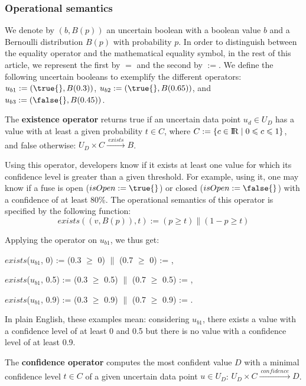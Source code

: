 \subsubsection{Operational semantics}
We denote by $(b, B(p))$ an uncertain boolean with a boolean value $b$ and a Bernoulli distribution $B(p)$ with probability $p$.
In order to distinguish between the equality operator and the mathematical equality symbol, in the rest of this article, we represent the first by $=$ and the second by $:=$.
We define the following uncertain booleans to exemplify the different operators: $u_{b1} := (\true{}, B(0.3))$, $u_{b2} := (\true{}, B(0.65))$, and $u_{b3} := (\false{}, B(0.45))$.

\begin{operator}
	\label{op:existence}
	The \textbf{existence operator} returns true if an uncertain data point $u_d \in U_D$ has a value with at least a given probability $t \in C$, where $C := \{ c \in {\rm I\!R} \mid 0 \leqslant c \leqslant 1 \}$, and false otherwise:  $U_D \times C \xrightarrow{~exists~} B$.
\end{operator}

Using this operator, developers know if it exists at least one value for which its confidence level is greater than a given threshold. For example, using it, one may know if a fuse is open ($isOpen := \true{}$) or closed ($isOpen := \false{}$) with a confidence of at least 80\%.
The operational semantics of this operator is specified by the following function: $$exists((v, B(p)), t) := (p \geqslant t) \| (1-p \geqslant t)$$

Applying the operator on $u_{b1}$, we thus get:
\begin{itemize*}
    \item[] $exists$($u_{b1}$, 0) := (0.3 $\geqslant$ 0) $\|$ (0.7 $\geqslant$ 0) := \true{},
    \item[] $exists$($u_{b1}$, 0.5) := (0.3 $\geqslant$ 0.5) $\|$ (0.7 $\geqslant$ 0.5) := \true{},
    \item[] $exists$($u_{b1}$, 0.9) := (0.3 $\geqslant$ 0.9) $\|$ (0.7 $\geqslant$ 0.9) := \false{}.
\end{itemize*}
In plain English, these examples mean: considering $u_{b1}$, there exists a value with a confidence level of at least 0 and 0.5 but there is no value with a confidence level of at least  0.9.

\begin{operator}
	\label{op:confidence}
	The \textbf{confidence operator} computes the most confident value $D$ with a minimal confidence level $t \in C$ of a given uncertain data point $u \in U_D$: $U_D \times C \xrightarrow{~confidence~ }  D$.
\end{operator}

